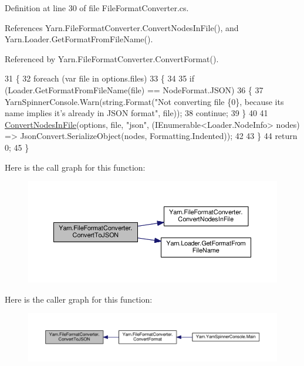 Definition at line 30 of file File\-Format\-Converter.\-cs.



References Yarn.\-File\-Format\-Converter.\-Convert\-Nodes\-In\-File(), and Yarn.\-Loader.\-Get\-Format\-From\-File\-Name().



Referenced by Yarn.\-File\-Format\-Converter.\-Convert\-Format().


\begin{DoxyCode}
31         \{
32             \textcolor{keywordflow}{foreach} (var file \textcolor{keywordflow}{in} options.files)
33             \{
34 
35                 \textcolor{keywordflow}{if} (Loader.GetFormatFromFileName(file) == NodeFormat.JSON)
36                 \{
37                     YarnSpinnerConsole.Warn(string.Format(\textcolor{stringliteral}{"Not converting file \{0\}, because its name
       implies it's already in JSON format"}, file));
38                     \textcolor{keywordflow}{continue};
39                 \}
40 
41                 \hyperlink{a00095_aa72838be584177b5592c31d73c0febdb}{ConvertNodesInFile}(options, file, \textcolor{stringliteral}{"json"}, (IEnumerable<Loader.NodeInfo> 
      nodes) => JsonConvert.SerializeObject(nodes, Formatting.Indented));
42 
43             \}
44             \textcolor{keywordflow}{return} 0;
45         \}
\end{DoxyCode}


Here is the call graph for this function\-:
\nopagebreak
\begin{figure}[H]
\begin{center}
\leavevmode
\includegraphics[width=350pt]{a00095_a28a086a7b44ecea7430af40436f38df6_cgraph}
\end{center}
\end{figure}




Here is the caller graph for this function\-:
\nopagebreak
\begin{figure}[H]
\begin{center}
\leavevmode
\includegraphics[width=350pt]{a00095_a28a086a7b44ecea7430af40436f38df6_icgraph}
\end{center}
\end{figure}


